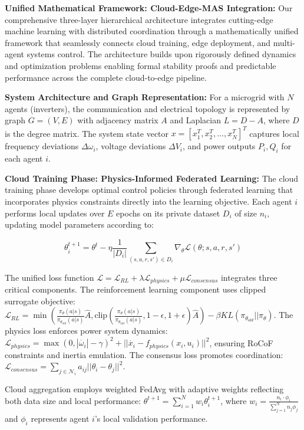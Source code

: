 \documentclass[12pt]{article}
\begin{document}
\textbf{Unified Mathematical Framework: Cloud-Edge-MAS Integration:} Our comprehensive three-layer hierarchical architecture integrates cutting-edge machine learning with distributed coordination through a mathematically unified framework that seamlessly connects cloud training, edge deployment, and multi-agent systems control. The architecture builds upon rigorously defined dynamics and optimization problems enabling formal stability proofs and predictable performance across the complete cloud-to-edge pipeline.

\textbf{System Architecture and Graph Representation:} For a microgrid with $N$ agents (inverters), the communication and electrical topology is represented by graph $G = (V, E)$ with adjacency matrix $A$ and Laplacian $L = D - A$, where $D$ is the degree matrix. The system state vector $x = [x_1^T, x_2^T, \ldots, x_N^T]^T$ captures local frequency deviations $\Delta\omega_i$, voltage deviations $\Delta V_i$, and power outputs $P_i, Q_i$ for each agent $i$.

\textbf{Cloud Training Phase: Physics-Informed Federated Learning:} The cloud training phase develops optimal control policies through federated learning that incorporates physics constraints directly into the learning objective. Each agent $i$ performs local updates over $E$ epochs on its private dataset $D_i$ of size $n_i$, updating model parameters according to:

$$\theta_i^{t+1} = \theta^t - \eta \frac{1}{|D_i|} \sum_{(s,a,r,s') \in D_i} \nabla_{\theta} \mathcal{L}(\theta; s, a, r, s')$$

The unified loss function $\mathcal{L} = \mathcal{L}_{RL} + \lambda \mathcal{L}_{physics} + \mu \mathcal{L}_{consensus}$ integrates three critical components. The reinforcement learning component uses clipped surrogate objective: $\mathcal{L}_{RL} = \min\left(\frac{\pi_{\theta}(a|s)}{\pi_{\theta_{old}}(a|s)} \hat{A}, \text{clip}\left(\frac{\pi_{\theta}(a|s)}{\pi_{\theta_{old}}(a|s)}, 1-\epsilon, 1+\epsilon\right) \hat{A}\right) - \beta KL(\pi_{\theta_{old}} || \pi_{\theta})$. The physics loss enforces power system dynamics: $\mathcal{L}_{physics} = \max(0, |\dot{\omega_i}| - \gamma)^2 + ||\dot{x_i} - f_{physics}(x_i, u_i)||^2$, ensuring RoCoF constraints and inertia emulation. The consensus loss promotes coordination: $\mathcal{L}_{consensus} = \sum_{j \in \mathcal{N}_i} a_{ij} ||\theta_i - \theta_j||^2$.

Cloud aggregation employs weighted FedAvg with adaptive weights reflecting both data size and local performance: $\theta^{t+1} = \sum_{i=1}^N w_i \theta_i^{t+1}$, where $w_i = \frac{n_i \cdot \phi_i}{\sum_{j=1}^N n_j \phi_j}$ and $\phi_i$ represents agent $i$'s local validation performance.
\end{document}
